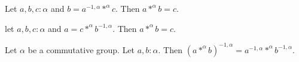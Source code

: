 \documentclass{article}
\begin{document}
\begin{forthel}
\begin{lemma} Let $a,b,c : \alpha$ and 
$b = a^{-1,\alpha} *^{\alpha} c$. Then $a *^{\alpha} b = c$.
\end{lemma}

\begin{lemma} let $a,b,c : \alpha$ and
$a = c *^{\alpha} b^{-1,\alpha}$. Then $a *^{\alpha} b = c$.
\end{lemma}

\begin{lemma} Let $\alpha$ be a commutative group. 
Let $a,b : \alpha$. Then 
$(a *^{\alpha} b)^{-1,\alpha} = a^{-1,\alpha} *^{\alpha} b^{-1,\alpha}$.
\end{lemma}

\end{forthel}
\end{document}
